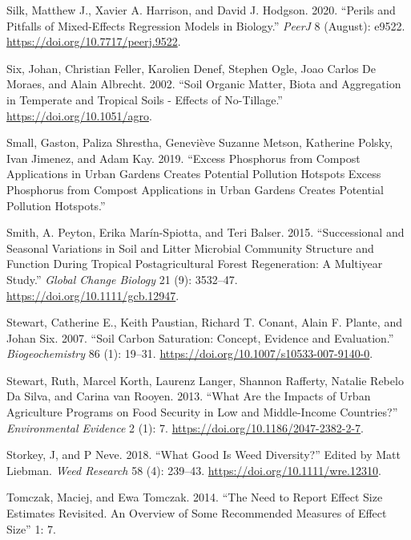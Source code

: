 \documentclass[
  12pt,
]{article}
\newlength{\cslhangindent}
\newlength{\cslentryspacingunit} %
\newenvironment{CSLReferences}[2] %
 {%
  \setlength{\parindent}{0pt}
  \ifodd #1
  \let\oldpar\par
  \def\par{\hangindent=\cslhangindent\oldpar}
  \fi
  \setlength{\parskip}{#2\cslentryspacingunit}
 }%
 {}
\begin{document}
\begin{CSLReferences}{1}{0}
\leavevmode{}%
Silk, Matthew J., Xavier A. Harrison, and David J. Hodgson. 2020. {``Perils and Pitfalls of Mixed-Effects Regression Models in Biology.''} \emph{PeerJ} 8 (August): e9522. \url{https://doi.org/10.7717/peerj.9522}.

\leavevmode{}%
Six, Johan, Christian Feller, Karolien Denef, Stephen Ogle, Joao Carlos De Moraes, and Alain Albrecht. 2002. {``Soil Organic Matter, Biota and Aggregation in Temperate and Tropical Soils - {Effects} of No-Tillage.''} \url{https://doi.org/10.1051/agro}.

\leavevmode{}%
Small, Gaston, Paliza Shrestha, Geneviève Suzanne Metson, Katherine Polsky, Ivan Jimenez, and Adam Kay. 2019. {``Excess Phosphorus from Compost Applications in Urban Gardens Creates Potential Pollution Hotspots {Excess} Phosphorus from Compost Applications in Urban Gardens Creates Potential Pollution Hotspots.''}

\leavevmode{}%
Smith, A. Peyton, Erika Marín-Spiotta, and Teri Balser. 2015. {``Successional and Seasonal Variations in Soil and Litter Microbial Community Structure and Function During Tropical Postagricultural Forest Regeneration: {A} Multiyear Study.''} \emph{Global Change Biology} 21 (9): 3532--47. \url{https://doi.org/10.1111/gcb.12947}.

\leavevmode{}%
Stewart, Catherine E., Keith Paustian, Richard T. Conant, Alain F. Plante, and Johan Six. 2007. {``Soil Carbon Saturation: Concept, Evidence and Evaluation.''} \emph{Biogeochemistry} 86 (1): 19--31. \url{https://doi.org/10.1007/s10533-007-9140-0}.

\leavevmode{}%
Stewart, Ruth, Marcel Korth, Laurenz Langer, Shannon Rafferty, Natalie Rebelo Da Silva, and Carina van Rooyen. 2013. {``What Are the Impacts of Urban Agriculture Programs on Food Security in Low and Middle-Income Countries?''} \emph{Environmental Evidence} 2 (1): 7. \url{https://doi.org/10.1186/2047-2382-2-7}.

\leavevmode{}%
Storkey, J, and P Neve. 2018. {``What Good Is Weed Diversity?''} Edited by Matt Liebman. \emph{Weed Research} 58 (4): 239--43. \url{https://doi.org/10.1111/wre.12310}.

\leavevmode{}%
Tomczak, Maciej, and Ewa Tomczak. 2014. {``The Need to Report Effect Size Estimates Revisited. {An} Overview of Some Recommended Measures of Effect Size''} 1: 7.


\end{CSLReferences}
\end{document}
